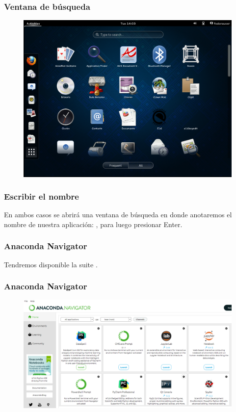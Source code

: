 \documentclass[12pt]{beamer}
\begin{document}
\begin{frame}
\frametitle{Ventana de búsqueda}
\begin{figure}
    \centering
    \includegraphics[scale=0.3]{Imagenes/Fedora_02.png}
\end{figure}
\end{frame}
\begin{frame}
\frametitle{Escribir el nombre}
En ambos casos se abrirá una ventana de búsqueda en donde anotaremos el nombre de nuestra aplicación: , para luego presionar Enter.
\end{frame}
\begin{frame}
\frametitle{Anaconda Navigator}
Tendremos disponible la suite .
\end{frame}
\begin{frame}
\frametitle{Anaconda Navigator}
\begin{figure}
    \centering
    \includegraphics[scale=0.35]{Imagenes/Anaconda_01.png}
\end{figure}
\end{frame}
\end{document}
